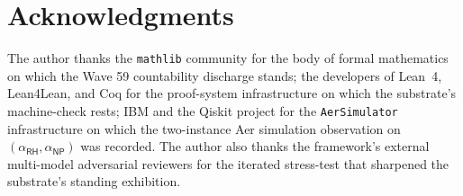 \documentclass[11pt,a4paper]{amsart}
\theoremstyle{plain}
\theoremstyle{definition}
\begin{document}
\section*{Acknowledgments}

The author thanks the \texttt{mathlib} community for the body of formal mathematics on which the Wave 59 countability discharge stands; the developers of Lean~4, Lean4Lean, and Coq for the proof-system infrastructure on which the substrate's machine-check rests; IBM and the Qiskit project for the \texttt{AerSimulator} infrastructure on which the two-instance Aer simulation observation on $(\alpha_{\textsf{RH}},\alpha_{\textsf{NP}})$ was recorded. The author also thanks the framework's external multi-model adversarial reviewers for the iterated stress-test that sharpened the substrate's standing exhibition.

\end{document}
